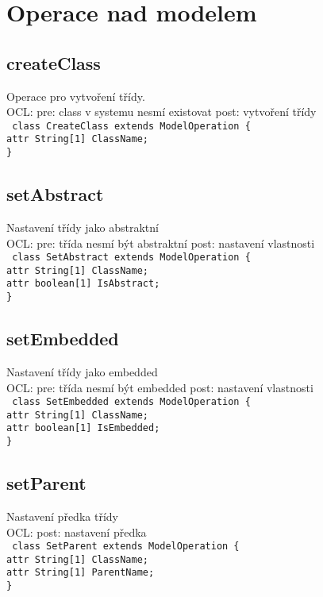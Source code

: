 \documentclass[11pt,a4paper]{article}
\begin{document}
\section{Operace nad modelem}
	\subsection{createClass}
	Operace pro vytvoření třídy. \\
	OCL: pre: class v systemu nesmí existovat post: vytvoření třídy\\
	\texttt{
			    class CreateClass extends ModelOperation \{ \\
      				attr String[1] ClassName; \\
   				\}	
	}
	\subsection{setAbstract}
	Nastavení třídy jako abstraktní \\
	OCL: pre: třída nesmí být abstraktní post: nastavení vlastnosti \\
	\texttt{
			    class SetAbstract extends ModelOperation \{\\
      				attr String[1] ClassName;\\
      				attr boolean[1] IsAbstract;\\
    		\}
	}
	\subsection{setEmbedded}
	Nastavení třídy jako embedded \\
	OCL: pre: třída nesmí být embedded post: nastavení vlastnosti \\
	\texttt{
    class SetEmbedded extends ModelOperation \{\\
      attr String[1] ClassName;\\
      attr boolean[1] IsEmbedded;\\
    \}
	}
	\subsection{setParent}
	Nastavení předka třídy \\
	OCL: post: nastavení předka \\
	\texttt{
    class SetParent extends ModelOperation \{\\
      attr String[1] ClassName;\\
      attr String[1] ParentName;\\
    \}
	}
\end{document}
